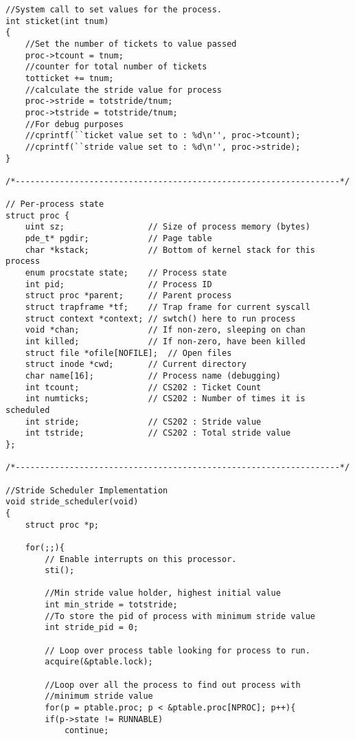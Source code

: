 \documentclass[a4paper, 10pt]{article}
\begin{document}
\begin{lstlisting}
//System call to set values for the process.
int sticket(int tnum)
{
    //Set the number of tickets to value passed
    proc->tcount = tnum;
    //counter for total number of tickets
    totticket += tnum;
    //calculate the stride value for process
    proc->stride = totstride/tnum;
    proc->tstride = totstride/tnum;
    //For debug purposes
    //cprintf(``ticket value set to : %d\n'', proc->tcount);
    //cprintf(``stride value set to : %d\n'', proc->stride);
}

/*------------------------------------------------------------------*/

// Per-process state
struct proc {
    uint sz;                 // Size of process memory (bytes)
    pde_t* pgdir;            // Page table
    char *kstack;            // Bottom of kernel stack for this process
    enum procstate state;    // Process state
    int pid;                 // Process ID
    struct proc *parent;     // Parent process
    struct trapframe *tf;    // Trap frame for current syscall
    struct context *context; // swtch() here to run process
    void *chan;              // If non-zero, sleeping on chan
    int killed;              // If non-zero, have been killed
    struct file *ofile[NOFILE];  // Open files
    struct inode *cwd;       // Current directory
    char name[16];           // Process name (debugging)
    int tcount;              // CS202 : Ticket Count
    int numticks;            // CS202 : Number of times it is scheduled
    int stride;              // CS202 : Stride value
    int tstride;             // CS202 : Total stride value
};

/*------------------------------------------------------------------*/

//Stride Scheduler Implementation
void stride_scheduler(void)
{
    struct proc *p;

    for(;;){
        // Enable interrupts on this processor.
        sti();

        //Min stride value holder, highest initial value
        int min_stride = totstride;
        //To store the pid of process with minimum stride value
        int stride_pid = 0;

        // Loop over process table looking for process to run.
        acquire(&ptable.lock);

        //Loop over all the process to find out process with
        //minimum stride value
        for(p = ptable.proc; p < &ptable.proc[NPROC]; p++){
        if(p->state != RUNNABLE)
            continue;


\end{lstlisting}
\end{document}

